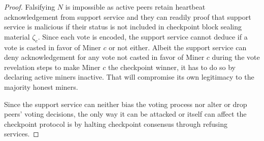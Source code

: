 \begin{proof}
Falsifying $N$ is impossible as active peers retain heartbeat acknowledgement from support service and they can readily proof that support service is malicious if their status is not included in checkpoint block sealing material $\zeta_e$. Since each vote is encoded, the support service cannot deduce if a vote is casted in favor of Miner $c$ or not either. Albeit the support service can deny acknowledgement for any vote not casted in favor of Miner $c$ during the vote revelation steps to make Miner $c$ the checkpoint winner, it has to do so by declaring active miners inactive. That will compromise its own legitimacy to the majority honest miners.

Since the support service can neither bias the voting process nor alter or drop peers' voting decisions, the only way it can be attacked or itself can affect the checkpoint protocol is by halting checkpoint consensus through refusing services.           
\end{proof}      
